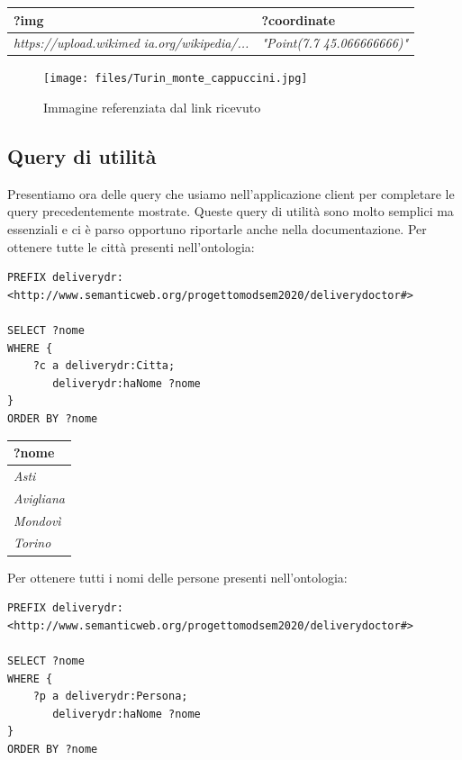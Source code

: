 \documentclass[12pt]{article}
\begin{document}
\begin{tabularx}{\textwidth} { 
  | >{\centering\arraybackslash}X
  | >{\centering\arraybackslash}X |}
 \hline
 \textbf{?img} & \textbf{?coordinate} \\
 \hline
 \textit{https://upload.wikimed} \textit{ia.org/wikipedia/...} & \textit{"Point(7.7 45.066666666)"} \\
\hline
\end{tabularx}
\newline
\begin{figure}[H]
    \centering
         \texttt{[image: files/Turin\_monte\_cappuccini.jpg]}
    \caption{Immagine referenziata dal link ricevuto}
\end{figure}
\newpage
\subsection{Query di utilità}
Presentiamo ora delle query che usiamo nell'applicazione client per completare le query precedentemente mostrate. Queste query di utilità sono molto semplici ma essenziali e ci è parso opportuno riportarle anche nella documentazione.\newline
Per ottenere tutte le città presenti nell'ontologia:
\begin{lstlisting}[language=SPARQL]
PREFIX deliverydr: 
<http://www.semanticweb.org/progettomodsem2020/deliverydoctor#>

SELECT ?nome
WHERE {
    ?c a deliverydr:Citta;
       deliverydr:haNome ?nome
}
ORDER BY ?nome
\end{lstlisting}
\begin{tabularx}{\textwidth} { 
  | >{\centering\arraybackslash}X |}
 \hline
 \textbf{?nome} \\
 \hline
 \textit{Asti} \\
 \hline
 \textit{Avigliana} \\
 \hline
 \textit{Mondovì} \\
 \hline
 \textit{Torino} \\
\hline
\end{tabularx}
\newline
\newline
Per ottenere tutti i nomi delle persone presenti nell'ontologia:
\begin{lstlisting}[language=SPARQL]
PREFIX deliverydr: 
<http://www.semanticweb.org/progettomodsem2020/deliverydoctor#>

SELECT ?nome
WHERE {
    ?p a deliverydr:Persona;
       deliverydr:haNome ?nome
}
ORDER BY ?nome
\end{lstlisting}
\end{document}
